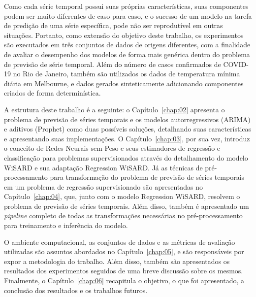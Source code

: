 Como cada série temporal possui suas próprias características, suas componentes podem ser muito diferentes de caso para caso, e o sucesso de um modelo na tarefa de predição de uma série específica, pode não ser reprodutível em outras situações. Portanto, como extensão do objetivo deste trabalho, os experimentos são executados em três conjuntos de dados de origens diferentes, com a finalidade de avaliar o desempenho dos modelos de forma mais genérica dentro do problema de previsão de série temporal. Além do número de casos confirmados de COVID-19 no Rio de Janeiro, também são utilizados os dados de temperatura mínima diária em Melbourne, e dados gerados sinteticamente adicionando componentes criados de forma determinística.

A estrutura deste trabalho é a seguinte: o Capítulo~\ref{chap:02} apresenta o problema de previsão de séries temporais e os modelos autorregressivos (ARIMA) e aditivos (Prophet) como duas possíveis soluções, detalhando suas características e apresentando suas implementações. O Capítulo~\ref{chap:03}, por sua vez, introduz o conceito de Redes Neurais sem Peso e seus estimadores de regressão e classificação para problemas supervisionados através do detalhamento do modelo WiSARD e sua adaptação Regression WiSARD. Já as técnicas de pré-processamento para transformação do problema de previsão de séries temporais em um problema de regressão supervisionado são apresentadas no Capítulo~\ref{chap:04}, que, junto com o modelo Regression WiSARD, resolvem o problema de previsão de séries temporais. Além disso, também é apresentado um \textit{pipeline} completo de todas as transformações necessárias no pré-processamento para treinamento e inferência do modelo.

O ambiente computacional, as conjuntos de dados e as métricas de avaliação utilizadas são assuntos abordados no Capítulo~\ref{chap:05}, e são responsáveis por expor a metodologia do trabalho. Além disso, também são apresentados os resultados dos experimentos seguidos de uma breve discussão sobre os mesmos. Finalmente, o Capítulo~\ref{chap:06} recapitula o objetivo, o que foi apresentado, a conclusão dos resultados e os trabalhos futuros.